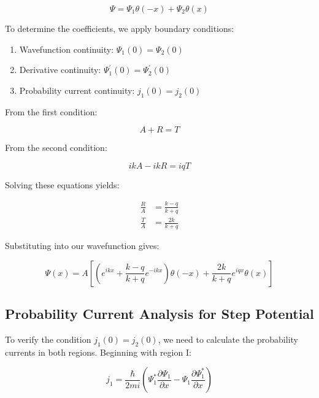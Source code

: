 \documentclass[italian]{HKNdocument}
\begin{document}
\begin{equation}
\Psi=\Psi_{1} \theta(-x)+\Psi_{2} \theta(x)
\end{equation}

To determine the coefficients, we apply boundary conditions:

\begin{enumerate}
  \item Wavefunction continuity: $\Psi_{1}(0)=\Psi_{2}(0)$
  \item Derivative continuity: $\Psi_{1}^{\prime}(0)=\Psi_{2}^{\prime}(0)$
  \item Probability current continuity: $j_{1}(0)=j_{2}(0)$
\end{enumerate}

From the first condition:

\begin{equation}
A+R=T
\end{equation}

From the second condition:

\begin{equation}
i k A-i k R=i q T
\end{equation}

Solving these equations yields:

\begin{align}
\frac{R}{A} & =\frac{k-q}{k+q} \\
\frac{T}{A} & =\frac{2 k}{k+q}
\end{align}

Substituting into our wavefunction gives:

\begin{equation}
\Psi(x)=A\left[\left(e^{i k x}+\frac{k-q}{k+q} e^{-i k x}\right) \theta(-x)+\frac{2 k}{k+q} e^{i q x} \theta(x)\right]
\end{equation}


\subsection{Probability Current Analysis for Step Potential}

To verify the condition $j_{1}(0)=j_{2}(0)$, we need to calculate the probability currents in both regions. Beginning with region I:

\begin{equation}
j_{1}=\frac{\hbar}{2 m i}\left(\Psi_{1}^{*} \frac{\partial \Psi_{1}}{\partial x}-\Psi_{1} \frac{\partial \Psi_{1}^{*}}{\partial x}\right)
\end{equation}
\end{document}
